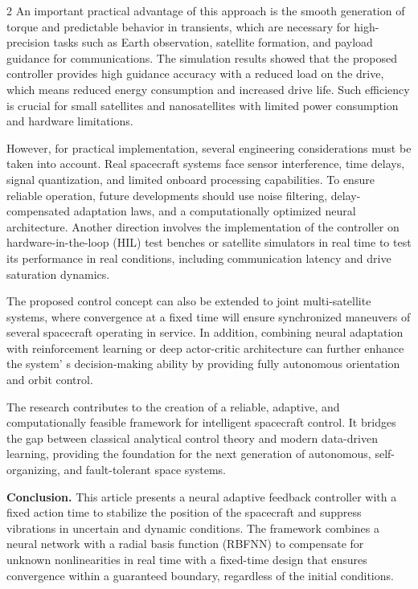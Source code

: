 \begin{multicols}{2}
An important practical advantage of this approach is the smooth
generation of torque and predictable behavior in transients, which are
necessary for high-precision tasks such as Earth observation, satellite
formation, and payload guidance for communications. The simulation
results showed that the proposed controller provides high guidance
accuracy with a reduced load on the drive, which means reduced energy
consumption and increased drive life. Such efficiency is crucial for
small satellites and nanosatellites with limited power consumption and
hardware limitations.

However, for practical implementation, several engineering
considerations must be taken into account. Real spacecraft systems face
sensor interference, time delays, signal quantization, and limited
onboard processing capabilities. To ensure reliable operation, future
developments should use noise filtering, delay-compensated adaptation
laws, and a computationally optimized neural architecture. Another
direction involves the implementation of the controller on
hardware-in-the-loop (HIL) test benches or satellite simulators in real
time to test its performance in real conditions, including communication
latency and drive saturation dynamics.

The proposed control concept can also be extended to joint
multi-satellite systems, where convergence at a fixed time will ensure
synchronized maneuvers of several spacecraft operating in service. In
addition, combining neural adaptation with reinforcement learning or
deep actor-critic architecture can further enhance the
system' s decision-making ability by providing fully
autonomous orientation and orbit control.

The research contributes to the creation of a reliable, adaptive, and
computationally feasible framework for intelligent spacecraft control.
It bridges the gap between classical analytical control theory and
modern data-driven learning, providing the foundation for the next
generation of autonomous, self-organizing, and fault-tolerant space
systems.

{\bfseries Conclusion.} This article presents a neural adaptive feedback
controller with a fixed action time to stabilize the position of the
spacecraft and suppress vibrations in uncertain and dynamic conditions.
The framework combines a neural network with a radial basis function
(RBFNN) to compensate for unknown nonlinearities in real time with a
fixed-time design that ensures convergence within a guaranteed boundary,
regardless of the initial conditions.


\end{multicols}
